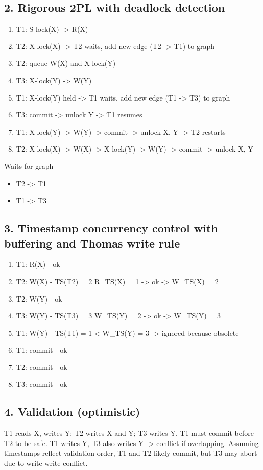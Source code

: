 \documentclass[fleqn]{article}
\begin{document}
  \subsection*{2. Rigorous 2PL with deadlock detection}
  \begin{enumerate}
    \item T1: S-lock(X) -> R(X)
    \item T2: X-lock(X) -> T2 waits, add new edge (T2 -> T1) to graph
    \item T2: queue W(X) and X-lock(Y)
    \item T3: X-lock(Y) -> W(Y)
    \item T1: X-lock(Y) held -> T1 waits, add new edge (T1 -> T3) to graph
    \item T3: commit -> unlock Y -> T1 resumes
    \item T1: X-lock(Y) -> W(Y) -> commit -> unlock X, Y -> T2 restarts
    \item T2: X-lock(X) -> W(X) -> X-lock(Y) -> W(Y) -> commit -> unlock X, Y
  \end{enumerate}
  Waits-for graph
  \begin{itemize}
    \item T2 -> T1
    \item T1 -> T3
  \end{itemize}


  \subsection*{3. Timestamp concurrency control with buffering and Thomas write rule}
  \begin{enumerate}
    \item T1: R(X) - ok
    \item T2: W(X) - TS(T2) = 2 \geq R_TS(X) = 1 -> ok -> W_TS(X) = 2
    \item T2: W(Y) - ok
    \item T3: W(Y) - TS(T3) = 3 \geq W_TS(Y) = 2 -> ok -> W_TS(Y) = 3
    \item T1: W(Y) - TS(T1) = 1 < W_TS(Y) = 3 -> ignored because obsolete
    \item T1: commit - ok
    \item T2: commit - ok
    \item T3: commit - ok
  \end{enumerate}

  
  \subsection*{4. Validation (optimistic)}
  T1 reads X, writes Y; T2 writes X and Y; T3 writes Y. T1 must commit before T2 to be safe. T1 writes Y, T3 also writes Y -> conflict if overlapping.
  Assuming timestamps reflect validation order, T1 and T2 likely commit, but T3 may abort due to write-write conflict.
\end{document}
